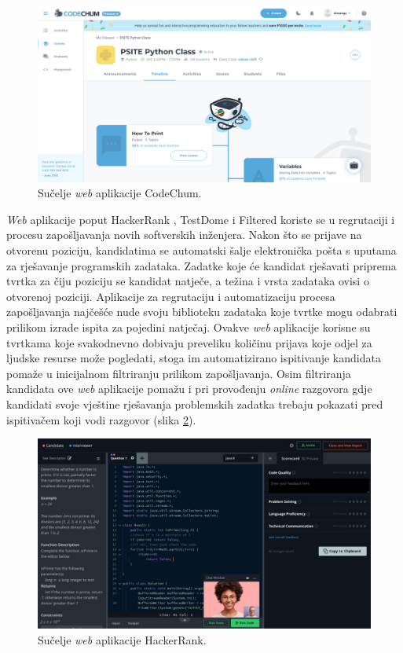 \documentclass[times, utf8, diplomski]{fer}
\begin{document}
\begin{figure}[htb]
	\centering
	\includegraphics[width=\textwidth]{images/CodeChum UI.png}
	\caption{
		Sučelje \textit{web} aplikacije CodeChum.
	}
	\label{fig:codechum-ui}
\end{figure}

\textit{Web} aplikacije poput HackerRank \citep{HackerRank}, TestDome \citep{TestDome} i Filtered \citep{Filtered} koriste se u regrutaciji i procesu zapošljavanja novih softverskih inženjera. Nakon što se prijave na otvorenu poziciju, kandidatima se automatski šalje elektronička pošta s uputama za rješavanje programskih zadataka. Zadatke koje će kandidat rješavati priprema tvrtka za čiju poziciju se kandidat natječe, a težina i vrsta zadataka ovisi o otvorenoj poziciji. Aplikacije za regrutaciju i automatizaciju procesa zapošljavanja najčešće nude svoju biblioteku zadataka koje tvrtke mogu odabrati prilikom izrade ispita za pojedini natječaj. Ovakve \textit{web} aplikacije korisne su tvrtkama koje svakodnevno dobivaju preveliku količinu prijava koje odjel za ljudske resurse može pogledati, stoga im automatizirano ispitivanje kandidata pomaže u inicijalnom filtriranju  prilikom zapošljavanja. Osim filtriranja kandidata ove \textit{web} aplikacije pomažu i pri provođenju \textit{online} razgovora gdje kandidati svoje vještine rješavanja problemskih zadatka trebaju pokazati pred ispitivačem koji vodi razgovor (slika \ref{fig:hackerrank-ui}).

\begin{figure}[htb]
	\centering
	\includegraphics[width=\textwidth]{images/HackerRank UI.png}
	\caption{
		Sučelje \textit{web} aplikacije HackerRank. \citep{HackerRank}
	}
	\label{fig:hackerrank-ui}
\end{figure}
\end{document}
